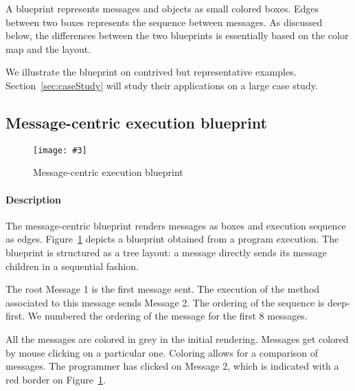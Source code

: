 \documentclass{sig-alternate}
\newcommand{\fig}[4]{
	\begin{figure}[#1]
		\centering
		\texttt{[image: \#3]}
		\caption{\label{fig:#3}#4}
	\end{figure}}
\newcommand{\figref}[1]{Figure~\ref{fig:#1}}
\newcommand{\secref}[1]{Section~\ref{sec:#1}}
\begin{document}
A blueprint represents messages and objects as small colored boxes. Edges between two boxes represents the sequence between messages. As discussed below, the differences between the two blueprints is essentially based on the color map and the layout.

We illustrate the blueprint on contrived but representative examples. \secref{caseStudy} will study their applications on a large case study.

%
%
%


\subsection{Message-centric execution blueprint}

\fig{}{0.48}{MessageCentricBlueprint}{Message-centric execution blueprint}

\paragraph{Description}

The message-centric blueprint renders messages as boxes and execution sequence as edges. \figref{MessageCentricBlueprint} depicts a blueprint obtained from a program execution. The blueprint is structured as a tree layout: a message directly sends its message children in a sequential fashion. 

The root Message 1 is the first message sent. The execution of the method associated to this message sends Message 2. The ordering of the sequence is deep-first. We numbered the ordering of the message for the first 8 messages. 

All the messages are colored in grey in the initial rendering. Messages get colored by mouse clicking on a particular one. 
Coloring allows for a comparison of messages. The programmer has clicked on Message 2, which is indicated with a red border on \figref{MessageCentricBlueprint}. 
\end{document}
